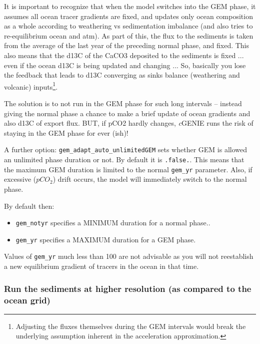 It is important to recognize that when the model switches into the GEM phase, it assumes all ocean tracer gradients are fixed, and updates only ocean composition as a whole according to weathering vs sedimentation imbalance (and also tries to re-equilibrium ocean and atm). As part of this, the flux to the sediments is taken from the average of the last year of the preceding normal phase, and fixed. This also means that the d13C of the CaCO3 deposited to the sediments is fixed ... even if the ocean d13C is being updated and changing ... So, basically you lose the feedback that leads to d13C converging as sinks balance (weathering and volcanic) inputs\footnote{Adjusting the fluxes themselves during the GEM intervals would break the underlying assumption inherent in the acceleration approximation.}.

The solution is to not run in the GEM phase for such long intervals -- instead giving the normal phase a chance to make a brief update of ocean gradients and also d13C of export flux. BUT, if pCO2 hardly changes, \textit{c}GENIE runs the risk of staying in the GEM phase for ever (ish)!

A further option: \texttt{gem\_adapt\_auto\_unlimitedGEM} sets whether GEM is allowed an unlimited phase duration or not. By default it is \texttt{.false.}. This means that the maximum GEM duration is limited to the normal \texttt{gem\_yr} parameter. Also, if excessive (\(pCO_{2}\)) drift occurs, the model will immediately switch to the normal phase.

\vspace{1mm}
By default then:
\begin{itemize}
        \item \texttt{gem\_notyr} specifies a MINIMUM duration for a normal phase..
        \item \texttt{gem\_yr} specifies a MAXIMUM duration for a GEM phase.
\end{itemize}
\vspace{1mm}
Values of \texttt{gem\_yr} much less than 100 are not advisable as you will not reestablish a new equilibrium gradient of tracers in the ocean in that time.

%
\newpage
\subsubsection{Run the sediments at higher resolution (as compared to the ocean grid)}\label{subsec:run_the_sediments_at_higher_resolution}
\vspace{1mm}

